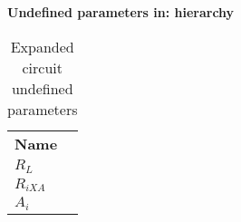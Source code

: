 {\textbf{Undefined parameters in: hierarchy}}

\begin{table}[H]
\centering
\begin{tabular}[c]{l}
\textbf{Name} \\ 
\rowcolor{myyellow}
$R_{L}$ \\ 
$R_{i XA}$ \\ 
\rowcolor{myyellow}
$A_{i}$ \\ 
\end{tabular}
\caption{Expanded circuit undefined parameters}
\end{table}

